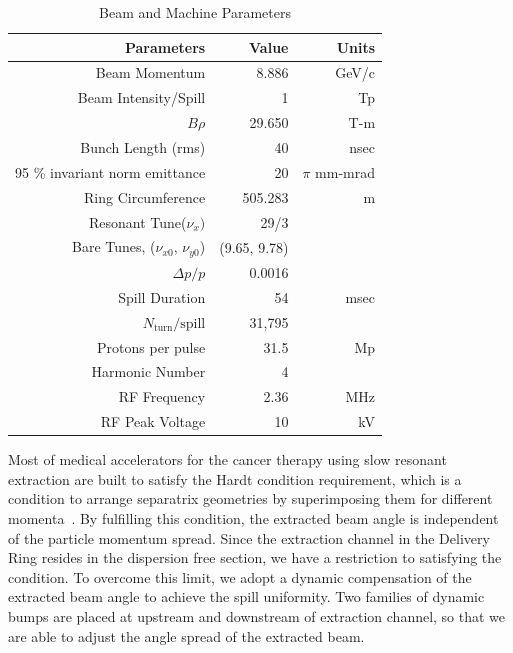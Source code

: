 \documentclass[aps,prstab,onecolumn,preprint]{revtex4-1}
\begin{document}
\begin{table}[hbp]
    \begin{tabular}{rrr}
    \hline
     Parameters                & Value              & Units         \\
    \hline
      Beam Momentum     & 8.886    & GeV/c   \\
      Beam Intensity/Spill         &  1 & Tp       \\
      $B \rho$                  & 29.650             & T-m           \\
      Bunch Length (rms)        & 40                 & nsec          \\
      95 \% invariant norm emittance & 20     & $\pi$ mm-mrad \\
      Ring Circumference  & 505.283            & m             \\
      Resonant Tune($\nu_{x})$   & 29/3 &  \\
      Bare Tunes, ($\nu_{x0}$, $\nu_{y0}$)   & (9.65, 9.78)   &    \\
      $\Delta p / p$           & 0.0016         &    \\
      Spill Duration &  54  & msec \\
      $N_{\text{turn}} / {\text{spill}}$    & 31,795   &    \\
      Protons per pulse     & 31.5  &  Mp   \\
      Harmonic Number           & 4                  &               \\
      RF Frequency              & 2.36               & MHz           \\
      RF Peak Voltage                & 10                 & kV            \\
    \hline
    \end{tabular}
    \caption{\label{table:param}Beam and Machine Parameters}
\end{table}


Most of medical accelerators for the cancer therapy using slow resonant extraction are built to satisfy the Hardt condition requirement, which is a condition to arrange separatrix geometries by superimposing them for different momenta~\cite{hardt,pullia,pimms}. By fulfilling this condition, the extracted beam angle is independent of the particle momentum spread. Since the extraction channel in the Delivery Ring resides in the dispersion free section, we have a restriction to satisfying the condition. To overcome this limit, we adopt a dynamic compensation of the extracted beam angle to achieve the spill uniformity. Two families of dynamic bumps are placed at upstream and downstream of extraction channel, so that we are able to adjust the angle spread of the extracted beam.
\end{document}

